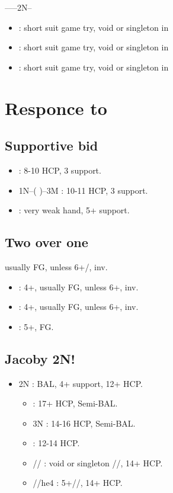 \documentclass[12pt,twoside,a5paper]{report}%
\begin{document}
	------2N--
	\begin{itemize}
	\renewcommand{\labelitemi}{}
	\item {} : short suit game try, void or singleton in \cl{}
	\item {} : short suit game try, void or singleton in \di{}
	\item {} : short suit game try, void or singleton in \sp{}
	\end{itemize}

	\chapter*{Responce to }
	
	\section*{Supportive bid}
	\begin{itemize}
	\renewcommand{\labelitemi}{}
	\item {} : 8-10 HCP, 3\sp{} support.
	\item 1N--( )--3M : 10-11 HCP, 3\sp{} support.
	\item {} : very weak hand, 5+\sp{} support.
	\end{itemize}

	\section*{Two over one}
	usually FG, unless 6+\cl{}/\di{}, inv.
	\begin{itemize}
	\renewcommand{\labelitemi}{}
	\item {} : 4+\cl{}, usually FG, unless 6+\cl{}, inv.
	\item {} : 4+\di{}, usually FG, unless 6+\di{}, inv.
	\item {} : 5+\he{}, FG.
	\end{itemize}
	
	\section*{Jacoby 2N!}
	\begin{itemize}
	\renewcommand{\labelitemi}{}
	\item 2N : BAL, 4+\sp{} support, 12+ HCP.
		\begin{itemize}
		\renewcommand{\labelitemi}{--}
		\item {} : 17+ HCP, Semi-BAL.
		\item 3N : 14-16 HCP, Semi-BAL.
		\item {} : 12-14 HCP.
		\item {}// : void or singleton //, 14+ HCP.
		\item {}//he{4} : 5+//, 14+ HCP.
		\end{itemize}
	\end{itemize}
\end{document}
